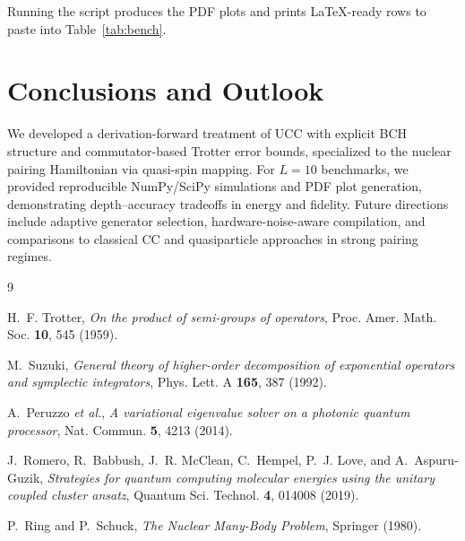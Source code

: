 \documentclass[11pt]{article}
\begin{document}
\noindent Running the script produces the PDF plots and prints LaTeX-ready rows to paste into
Table~\ref{tab:bench}.

\section{Conclusions and Outlook}
We developed a derivation-forward treatment of UCC with explicit BCH structure and commutator-based
Trotter error bounds, specialized to the nuclear pairing Hamiltonian via quasi-spin mapping.
For $L=10$ benchmarks, we provided reproducible NumPy/SciPy simulations and PDF plot generation,
demonstrating depth--accuracy tradeoffs in energy and fidelity.
Future directions include adaptive generator selection, hardware-noise-aware compilation, and
comparisons to classical CC and quasiparticle approaches in strong pairing regimes.

\begin{thebibliography}{9}

  H.~F. Trotter, \emph{On the product of semi-groups of operators}, Proc. Amer. Math. Soc. \textbf{10}, 545 (1959).

  M.~Suzuki, \emph{General theory of higher-order decomposition of exponential operators and symplectic integrators},
  Phys. Lett. A \textbf{165}, 387 (1992).

  A.~Peruzzo \emph{et al.}, \emph{A variational eigenvalue solver on a photonic quantum processor},
  Nat. Commun. \textbf{5}, 4213 (2014).

  J.~Romero, R.~Babbush, J.~R. McClean, C.~Hempel, P.~J. Love, and A.~Aspuru-Guzik,
  \emph{Strategies for quantum computing molecular energies using the unitary coupled cluster ansatz},
  Quantum Sci. Technol. \textbf{4}, 014008 (2019).

  P.~Ring and P.~Schuck, \emph{The Nuclear Many-Body Problem}, Springer (1980).

\end{thebibliography}
\end{document}
